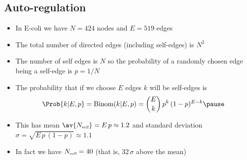 \begin{slide}
\section[-2]{Auto-regulation}

\begin{PauseHighLight}
  \begin{itemize}
  \item In E-coli we have $N=424$ nodes and $E=519$ edges\pause
  \item The total number of directed edges (including self-edges) is
    $N^2$\pause
  \item The number of self edges is $N$ so the probability of a randomly
    chosen edge being a self-edge is $p=1/N$\pause
  \item The probability that if we choose $E$ edges $k$ will be
    self-edges is
    \begin{align*}
      \Prob{k|E,p} = \mathrm{Binom}(k|E,p) = \binom{E}{k}\,p^k\,(1-p)^{E-k}\pause
    \end{align*}
  \item This has mean $\av{N_{\text{\tiny self}}} = E\,p \approx 1.2$ and
    standard deviation $\sigma = \sqrt{E\,p\,(1-p)} \approx 1.1$\pause
  \item In fact we have $N_{\text{\tiny self}}=40$\pause{} (that is, $32\,\sigma$
    above the mean)\pauseb
  \end{itemize}
\end{PauseHighLight}

\end{slide}


